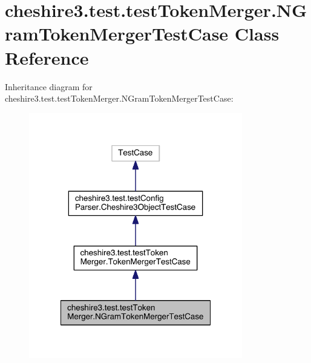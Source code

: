 \hypertarget{classcheshire3_1_1test_1_1test_token_merger_1_1_n_gram_token_merger_test_case}{\section{cheshire3.\-test.\-test\-Token\-Merger.\-N\-Gram\-Token\-Merger\-Test\-Case Class Reference}
\label{classcheshire3_1_1test_1_1test_token_merger_1_1_n_gram_token_merger_test_case}
}


Inheritance diagram for cheshire3.\-test.\-test\-Token\-Merger.\-N\-Gram\-Token\-Merger\-Test\-Case\-:
\nopagebreak
\begin{figure}[H]
\begin{center}
\leavevmode
\includegraphics[width=264pt]{classcheshire3_1_1test_1_1test_token_merger_1_1_n_gram_token_merger_test_case__inherit__graph}
\end{center}
\end{figure}


